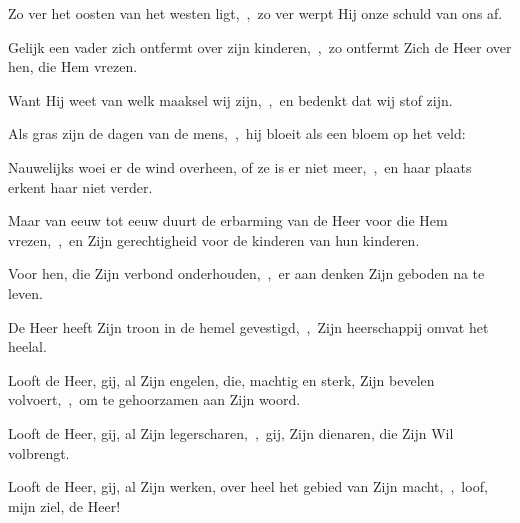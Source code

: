 \documentclass[12pt,twoside,a5paper]{article}
\begin{document}
\begin{halfparskip}
  Zo ver het oosten van het westen ligt,~\sep\ zo ver werpt Hij onze schuld van ons af.

  Gelijk een vader zich ontfermt over zijn kinderen,~\sep\ zo ontfermt Zich de Heer over hen, die Hem vrezen.

  Want Hij weet van welk maaksel wij zijn,~\sep\ en bedenkt dat wij stof zijn.

  Als gras zijn de dagen van de mens,~\sep\ hij bloeit als een bloem op het veld:

  Nauwelijks woei er de wind overheen, of ze is er niet meer,~\sep\ en haar plaats erkent haar niet verder.

  Maar van eeuw tot eeuw duurt de erbarming van de Heer voor die Hem vrezen,~\sep\ en Zijn gerechtigheid voor de kinderen van hun kinderen.

  Voor hen, die Zijn verbond onderhouden,~\sep\ er aan denken Zijn geboden na te leven.

  De Heer heeft Zijn troon in de hemel gevestigd,~\sep\ Zijn heerschappij omvat het heelal.

  Looft de Heer, gij, al Zijn engelen, die, machtig en sterk, Zijn bevelen volvoert,~\sep\ om te gehoorzamen aan Zijn woord.

  Looft de Heer, gij, al Zijn legerscharen,~\sep\ gij, Zijn dienaren, die Zijn Wil volbrengt.

  Looft de Heer, gij, al Zijn werken, over heel het gebied van Zijn macht,~\sep\ loof, mijn ziel, de Heer!
\end{halfparskip}
\end{document}
